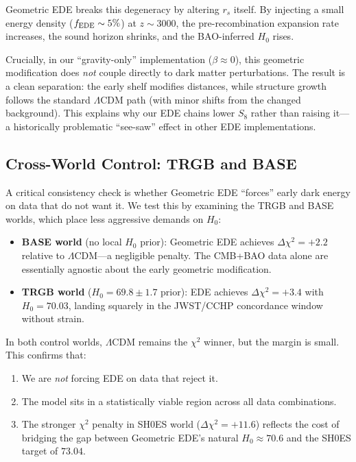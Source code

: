 Geometric EDE breaks this degeneracy by altering $r_s$ itself. By injecting a small energy density ($f_{\rm EDE} \sim 5\%$) at $z \sim 3000$, the pre-recombination expansion rate increases, the sound horizon shrinks, and the BAO-inferred $H_0$ rises.

Crucially, in our ``gravity-only'' implementation ($\beta \approx 0$), this geometric modification does \emph{not} couple directly to dark matter perturbations. The result is a clean separation: the early shelf modifies distances, while structure growth follows the standard $\Lambda$CDM path (with minor shifts from the changed background). This explains why our EDE chains lower $S_8$ rather than raising it---a historically problematic ``see-saw'' effect in other EDE implementations.

\subsection{Cross-World Control: TRGB and BASE}

A critical consistency check is whether Geometric EDE ``forces'' early dark energy on data that do not want it. We test this by examining the TRGB and BASE worlds, which place less aggressive demands on $H_0$:

\begin{itemize}
    \item \textbf{BASE world} (no local $H_0$ prior): Geometric EDE achieves $\Delta\chi^2 = +2.2$ relative to $\Lambda$CDM---a negligible penalty. The CMB+BAO data alone are essentially agnostic about the early geometric modification.
    
    \item \textbf{TRGB world} ($H_0 = 69.8 \pm 1.7$ prior): EDE achieves $\Delta\chi^2 = +3.4$ with $H_0 = 70.03$, landing squarely in the JWST/CCHP concordance window without strain.
\end{itemize}

In both control worlds, $\Lambda$CDM remains the $\chi^2$ winner, but the margin is small. This confirms that:
\begin{enumerate}
    \item We are \emph{not} forcing EDE on data that reject it.
    \item The model sits in a statistically viable region across all data combinations.
    \item The stronger $\chi^2$ penalty in SH0ES world ($\Delta\chi^2 = +11.6$) reflects the cost of bridging the gap between Geometric EDE's natural $H_0 \approx 70.6$ and the SH0ES target of $73.04$.
\end{enumerate}

